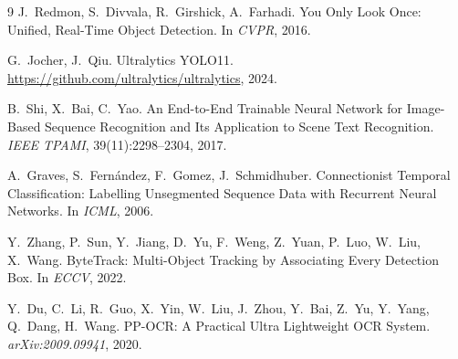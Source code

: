 \begin{thebibliography}{9}
J.~Redmon, S.~Divvala, R.~Girshick, A.~Farhadi.
\newblock You Only Look Once: Unified, Real-Time Object Detection.
\newblock In \emph{CVPR}, 2016.

G.~Jocher, J.~Qiu.
\newblock Ultralytics YOLO11.
\newblock \url{https://github.com/ultralytics/ultralytics}, 2024.

B.~Shi, X.~Bai, C.~Yao.
\newblock An End-to-End Trainable Neural Network for Image-Based Sequence Recognition and Its Application to Scene Text Recognition.
\newblock \emph{IEEE TPAMI}, 39(11):2298--2304, 2017.

A.~Graves, S.~Fernández, F.~Gomez, J.~Schmidhuber.
\newblock Connectionist Temporal Classification: Labelling Unsegmented Sequence Data with Recurrent Neural Networks.
\newblock In \emph{ICML}, 2006.

Y.~Zhang, P.~Sun, Y.~Jiang, D.~Yu, F.~Weng, Z.~Yuan, P.~Luo, W.~Liu, X.~Wang.
\newblock ByteTrack: Multi-Object Tracking by Associating Every Detection Box.
\newblock In \emph{ECCV}, 2022.

Y.~Du, C.~Li, R.~Guo, X.~Yin, W.~Liu, J.~Zhou, Y.~Bai, Z.~Yu, Y.~Yang, Q.~Dang, H.~Wang.
\newblock PP-OCR: A Practical Ultra Lightweight OCR System.
\newblock \emph{arXiv:2009.09941}, 2020.
\end{thebibliography}
